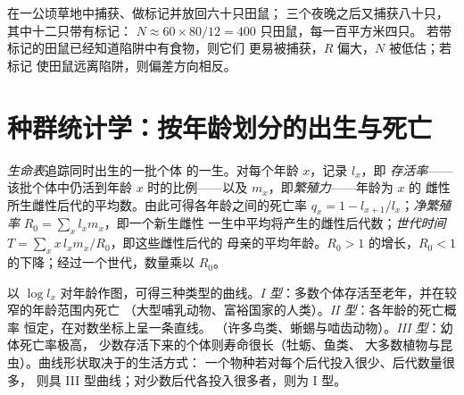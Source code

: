 \begin{example}[草地中的田鼠]\label{ex:b1:populations:voles}
在一公顷草地中捕获、做标记并放回六十只田鼠；
三个夜晚之后又捕获八十只，其中十二只带有标记：
$N \approx 60\times 80/12 = 400$ 只田鼠，每一百平方米四只。
若带标记的田鼠已经知道陷阱中有食物，则它们
更易被捕获，$R$ 偏大，$N$ 被低估；若标记
使田鼠远离陷阱，则偏差方向相反。
\end{example}

\section{种群统计学：按年龄划分的出生与死亡}

\begin{definition}[生命表]\label{def:b1:populations:lifetable}
\emph{生命表}追踪同时出生的一批个体
的一生。对每个年龄 $x$，记录 $l_x$，即
\emph{存活率}——该批个体中仍活到年龄 $x$
时的比例——以及 $m_x$，即\emph{繁殖力}——年龄为 $x$ 的
雌性所生雌性后代的平均数。由此可得各年龄之间的死亡率
$q_x = 1 - l_{x+1}/l_x$；\emph{净繁殖
率} $R_0 = \sum_x l_x m_x$，即一个新生雌性
一生中平均将产生的雌性后代数；\emph{世代时间}
$T = \sum_x x\,l_x m_x / R_0$，即这些雌性后代的
母亲的平均年龄。$R_0 > 1$ 的增长，$R_0 < 1$
的下降；经过一个世代，数量乘以 $R_0$。
\end{definition}

\begin{proposition}[存活曲线的三种类型]\label{prop:b1:populations:survivorship}
以 $\log l_x$ 对年龄作图，可得三种类型的曲线。\emph{I
型}：多数个体存活至老年，并在较窄的年龄范围内死亡
（大型哺乳动物、富裕国家的人类）。\emph{II 型}：各年龄的死亡概率
恒定，在对数坐标上呈一条直线。
（许多鸟类、蜥蜴与啮齿动物）。\emph{III 型}：幼体死亡率极高，
少数存活下来的个体则寿命很长（牡蛎、鱼类、
大多数植物与昆虫）。曲线形状取决于的生活方式：
一个物种若对每个后代投入很少、后代数量很多，
则具 III 型曲线；对少数后代各投入很多者，则为 I 型。
\end{proposition}


